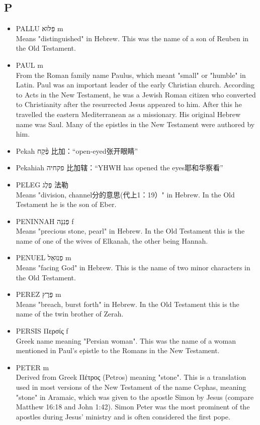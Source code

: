 \subsection{P}
\begin{itemize}
\itemsep-.5em 
\item PALLU פַּלּוּא m \\
Means "distinguished" in Hebrew. This was the name of a son of Reuben in the Old Testament.
\item PAUL m \\
From the Roman family name Paulus, which meant "small" or "humble" in Latin. Paul was an important leader of the early Christian church. According to Acts in the New Testament, he was a Jewish Roman citizen who converted to Christianity after the resurrected Jesus appeared to him. After this he travelled the eastern Mediterranean as a missionary. His original Hebrew name was Saul. Many of the epistles in the New Testament were authored by him. 
\item Pekah פֶּ֨קַח 比加：“open-eyed张开眼睛”
\item Pekahiah פקחיה 比加辖：“YHWH has opened the eyes耶和华察看”
\item PELEG פֶּלֶג 法勒 \\
Means "division, channel分的意思(代上1：19）" in Hebrew. In the Old Testament he is the son of Eber.
\item PENINNAH פְּנִנָּה f \\
Means "precious stone, pearl" in Hebrew. In the Old Testament this is the name of one of the wives of Elkanah, the other being Hannah.
\item PENUEL פְנוּאֵל m \\
Means "facing God" in Hebrew. This is the name of two minor characters in the Old Testament.
\item PEREZ פֶּרֶץ m \\
Means "breach, burst forth" in Hebrew. In the Old Testament this is the name of the twin brother of Zerah.
\item PERSIS Περσίς f \\
Greek name meaning "Persian woman". This was the name of a woman mentioned in Paul's epistle to the Romans in the New Testament.
\item PETER m \\
Derived from Greek Πέτρος (Petros) meaning "stone". This is a translation used in most versions of the New Testament of the name Cephas, meaning "stone" in Aramaic, which was given to the apostle Simon by Jesus (compare Matthew 16:18 and John 1:42). Simon Peter was the most prominent of the apostles during Jesus' ministry and is often considered the first pope.

\end{itemize}
